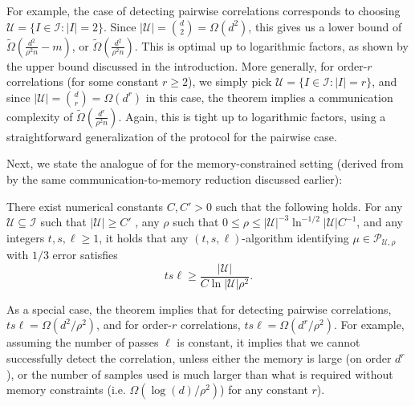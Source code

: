 For example, the case of detecting pairwise correlations corresponds to choosing $\mathcal{U} = \{ I \in \mathcal{I} \colon \lvert I \rvert = 2\}$. Since $|\mathcal{U}|=\binom{d}{2}=\Omega(d^2)$, this gives us a lower bound of $\tilde\Omega\left( \frac{d^2}{\rho^2 n}-m \right)$, or $\tilde\Omega\left( \frac{d^2}{\rho^2 n}\right)$. This is optimal up to logarithmic factors, as shown by the upper bound discussed in the introduction. More generally, for order-$r$ correlations (for some constant $r\geq 2$), we simply pick $\mathcal{U} = \{ I \in \mathcal{I} \colon \lvert I \rvert = r\}$, and since $|\mathcal{U}|=\binom{d}{r}=\Omega(d^r)$ in this case, the theorem implies a communication complexity of $\tilde\Omega\left( \frac{d^r}{\rho^2 n}\right)$. Again, this is tight up to logarithmic factors, using a straightforward generalization of the protocol for the pairwise case.

Next, we state the analogue of  for the memory-constrained setting (derived from  by the same communication-to-memory reduction discussed earlier):

\begin{theorem} \label{thm:mem-subset}
There exist numerical constants $C,C'>0$ such that the following holds. For any $\mathcal{U} \subseteq \mathcal{I}$ such that $\lvert \mathcal{U} \rvert \ge C'$ , any $\rho$ such that $0\le \rho\le \lvert \mathcal{U} \rvert^{-3} \ln^{-1/2} \lvert \mathcal{U} \rvert C^{-1}$, and any integers $t,s,\ell \ge 1$, it holds that any $(t,s,\ell)$-algorithm identifying $\mu \in \mathcal{P}_{\mathcal{U},\rho}$ with $1/3$ error satisfies
\[
ts\ell \ge \frac{\lvert \mathcal{U} \rvert}{C \ln \lvert\mathcal{U}\rvert \rho^2}.
\]
\end{theorem}

As a special case, the theorem implies that for detecting pairwise correlations, $ts\ell=\Omega(d^2/\rho^2)$, and for order-$r$ correlations, $ts\ell=\Omega(d^r/\rho^2)$. For example, assuming the number of passes $\ell$ is constant, it implies that we cannot successfully detect the correlation, unless either the memory is large (on order $d^r$), or the number of samples used is much larger than what is required without memory constraints (i.e. $\Omega(\log(d)/\rho^2)$) for any constant $r$). 

